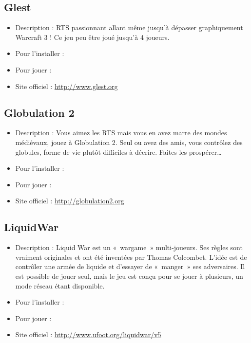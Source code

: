 \subsection{Glest}
\begin{itemize}
\begingroup
{}
\item Description : RTS passionnant allant même jusqu'à dépasser graphiquement Warcraft 3 ! Ce jeu peu être joué jusqu'à 4 joueurs.{\par}
\item Pour l'installer : 
\endgroup
\item Pour jouer : 
\item Site officiel : \url{http://www.glest.org}{\par}
\end{itemize}
\subsection{Globulation 2}
\begin{itemize}
\begingroup
{}
\item Description : Vous aimez les RTS mais vous en avez marre des mondes médiévaux, jouez à Globulation 2. Seul ou avez des amis, vous contrôlez des globules, forme de vie plutôt difficiles à décrire. Faites-les prospérer\ldots{}{\par}
\item Pour l'installer : 
\item Pour jouer : 
\item Site officiel : \url{http://globulation2.org}{\par}
\endgroup
\end{itemize}
\subsection{LiquidWar}
\begin{itemize}
\begingroup
{}
\item Description : Liquid War est un «~wargame~» multi-joueurs. Ses règles sont vraiment originales et ont été inventées par Thomas Colcombet. L'idée est de contrôler une armée de liquide et d'essayer de «~manger~» ses adversaires. Il est possible de jouer seul, mais le jeu est conçu pour se jouer à plusieurs, un mode réseau étant disponible.{\par}
\item Pour l'installer : 
\item Pour jouer : 
\item Site officiel : \url{http://www.ufoot.org/liquidwar/v5}{\par}
\endgroup
\end{itemize}
